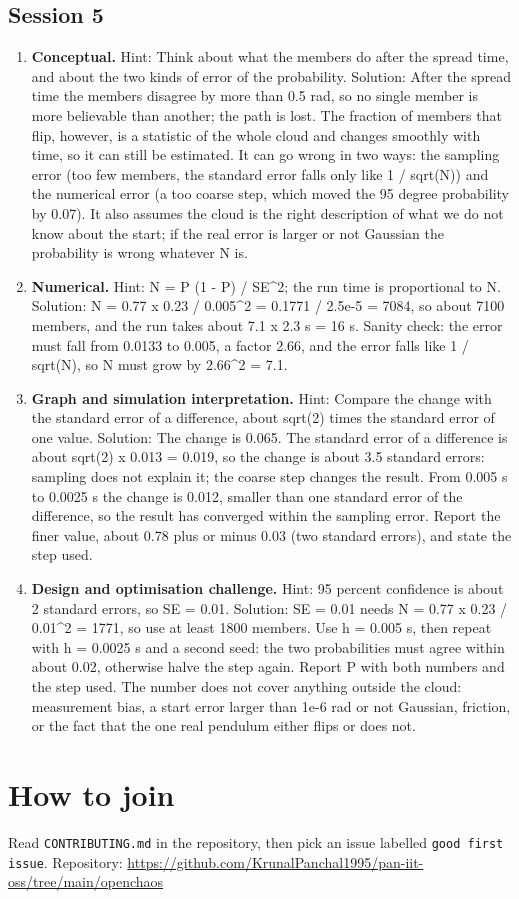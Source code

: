 \documentclass[11pt,a4paper]{article}
\begin{document}
\subsection*{Session 5}
\begin{enumerate}[nosep]
\item \textbf{Conceptual.} Hint: Think about what the members do after the spread time, and about the two kinds of error of the probability. Solution: After the spread time the members disagree by more than 0.5 rad, so no single member is more believable than another; the path is lost. The fraction of members that flip, however, is a statistic of the whole cloud and changes smoothly with time, so it can still be estimated. It can go wrong in two ways: the sampling error (too few members, the standard error falls only like 1 / sqrt(N)) and the numerical error (a too coarse step, which moved the 95 degree probability by 0.07). It also assumes the cloud is the right description of what we do not know about the start; if the real error is larger or not Gaussian the probability is wrong whatever N is.
\item \textbf{Numerical.} Hint: N = P (1 - P) / SE\textasciicircum{}2; the run time is proportional to N. Solution: N = 0.77 x 0.23 / 0.005\textasciicircum{}2 = 0.1771 / 2.5e-5 = 7084, so about 7100 members, and the run takes about 7.1 x 2.3 s = 16 s. Sanity check: the error must fall from 0.0133 to 0.005, a factor 2.66, and the error falls like 1 / sqrt(N), so N must grow by 2.66\textasciicircum{}2 = 7.1.
\item \textbf{Graph and simulation interpretation.} Hint: Compare the change with the standard error of a difference, about sqrt(2) times the standard error of one value. Solution: The change is 0.065. The standard error of a difference is about sqrt(2) x 0.013 = 0.019, so the change is about 3.5 standard errors: sampling does not explain it; the coarse step changes the result. From 0.005 s to 0.0025 s the change is 0.012, smaller than one standard error of the difference, so the result has converged within the sampling error. Report the finer value, about 0.78 plus or minus 0.03 (two standard errors), and state the step used.
\item \textbf{Design and optimisation challenge.} Hint: 95 percent confidence is about 2 standard errors, so SE = 0.01. Solution: SE = 0.01 needs N = 0.77 x 0.23 / 0.01\textasciicircum{}2 = 1771, so use at least 1800 members. Use h = 0.005 s, then repeat with h = 0.0025 s and a second seed: the two probabilities must agree within about 0.02, otherwise halve the step again. Report P with both numbers and the step used. The number does not cover anything outside the cloud: measurement bias, a start error larger than 1e-6 rad or not Gaussian, friction, or the fact that the one real pendulum either flips or does not.
\end{enumerate}

\section{How to join}
Read \texttt{CONTRIBUTING.md} in the repository, then pick an issue labelled \texttt{good first issue}. Repository: \url{https://github.com/KrunalPanchal1995/pan-iit-oss/tree/main/openchaos}
\end{document}
